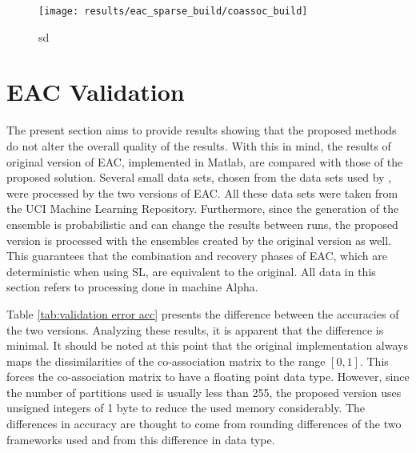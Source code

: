 \begin{figure}[hbtp]
\centering
\texttt{[image: results/eac\_sparse\_build/coassoc\_build]}
\caption{sd}
\label{fig:coassoc build sparse}
\end{figure}


%
%

\section{EAC Validation}
\label{sec:eac validation}

The present section aims to provide results showing that the proposed methods do not alter the overall quality of the results.
With this in mind, the results of original version of EAC, implemented in Matlab, are compared with those of the proposed solution.
Several small data sets, chosen from the data sets used by \citet{Lourenco2010}, were processed by the two versions of EAC.
All these data sets were taken from the UCI Machine Learning Repository. %
Furthermore, since the generation of the ensemble is probabilistic and can change the results between runs, the proposed version is processed with the ensembles created by the original version as well.
This guarantees that the combination and recovery phases of EAC, which are deterministic when using SL, are equivalent to the original.
All data in this section refers to processing done in machine Alpha.

Table \ref{tab:validation error acc} presents the difference between the accuracies of the two versions.
Analyzing these results, it is apparent that the difference is minimal.
It should be noted at this point that the original implementation always maps the dissimilarities of the co-association matrix to the range $\left [ 0 , 1 \right ]$.
This forces the co-association matrix to have a floating point data type.
However, since the number of partitions used is usually less than 255, the proposed version uses unsigned integers of 1 byte to reduce the used memory considerably.
The differences in accuracy are thought to come from rounding differences of the two frameworks used and from this difference in data type.






